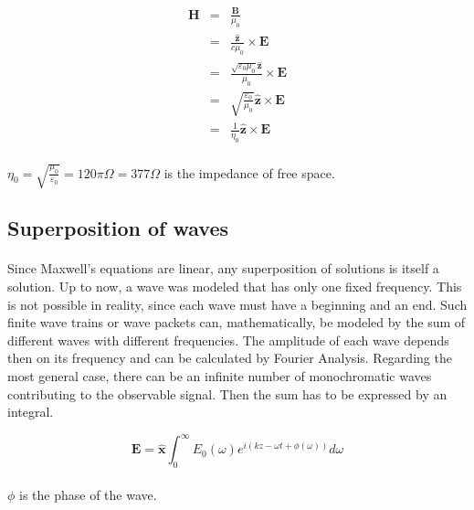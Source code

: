 \documentclass[a4paper,10pt]{thesis}
\begin{document}
\begin{eqnarray}
\textbf{H} &=&\frac{\mathbf{B}}{\mu_0}\label{plane_wave_H_simpli}\\
&=& \frac{\mathbf{\hat{z}}}{c \mu_0}\times \mathbf{E}\nonumber \\
&=& \frac{\sqrt{\varepsilon_0 \mu_0 }\mathbf{ \hat{z}}}{\mu_0}\times \mathbf{E}\nonumber \\
&=& \sqrt{\frac{\varepsilon_0}{\mu_0 }}\mathbf{ \hat{z}}\times \mathbf{E}\nonumber \\
&=& \frac{1}{\eta_0}\mathbf{ \hat{z}}\times \mathbf{E} \nonumber
\end{eqnarray}

\paragraph*{}
$\eta_0 = \sqrt{\frac{\mu_0}{\varepsilon_0 }} = 120 \pi \Omega = 377 \Omega$ is the impedance of free space.

\subsection{Superposition of waves}
\paragraph*{}
Since Maxwell's equations are linear, any superposition of solutions is itself a solution. Up to now, a wave was modeled that has only one fixed frequency. This is not possible in reality, since each wave must have a beginning and an end. Such finite wave trains or wave packets can, mathematically, be modeled by the sum of different waves with
different frequencies. The amplitude of each wave depends then on its frequency and can be calculated by Fourier Analysis. Regarding the most general case, there can be an infinite number of monochromatic waves contributing to the observable signal. Then the sum has to be expressed by an integral.

\begin{equation}\label{superpos_of_waves}
    \mathbf{E}= \mathbf{\hat{x}} \int_0^\infty E_0(\omega ) e^{i(kz-\omega t + \phi(\omega)) }d\omega
\end{equation}

\paragraph*{}
$\phi$ is the phase of the wave.
\end{document}
